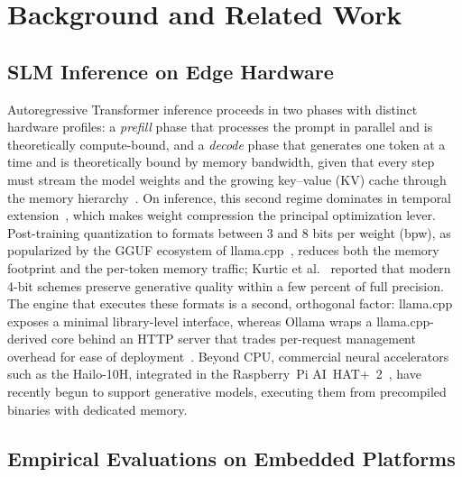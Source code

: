 \documentclass[acmsmall,natbib=false]{acmart}
\begin{document}
\section{Background and Related Work}\label{sec:related}

\subsection{SLM Inference on Edge Hardware}

Autoregressive Transformer inference proceeds in two phases with distinct
hardware profiles: a \emph{prefill} phase that processes the prompt in
parallel and is theoretically compute-bound, and a \emph{decode} phase that
generates one token at a time and is theoretically bound by memory bandwidth,
given that every step must stream the model weights and the growing key--value (KV)
cache through the memory hierarchy~\cite{whatmough_generative_2025}.
 On inference, this second regime dominates in temporal extension~\cite{li_large_2025}, which makes weight compression the
principal optimization lever. Post-training quantization to formats between 3
and 8 bits per weight (bpw), as popularized by the GGUF ecosystem of
llama.cpp~\cite{gerganov_llamacpp_2023,ggml-org_gguf}, reduces both the
memory footprint and the per-token memory traffic; Kurtic et
al.~\cite{kurtic_give_2025} reported that modern 4-bit schemes preserve
generative quality within a few percent of full precision. The engine that executes these formats
is a second, orthogonal factor:
llama.cpp exposes a minimal library-level interface, whereas Ollama wraps a
llama.cpp-derived core behind an HTTP server that trades per-request
management overhead for ease of deployment~\cite{ollama_2023,Github_Issue_Ollama}.
Beyond CPU, commercial neural
accelerators such as the Hailo-10H, integrated in the Raspberry~Pi
AI~HAT+~2~\cite{raspberrypi_ai_hat_plus_2_product_brief}, have recently begun
to support generative models, executing them from precompiled binaries with
dedicated memory.

\subsection{Empirical Evaluations on Embedded Platforms}
\end{document}
